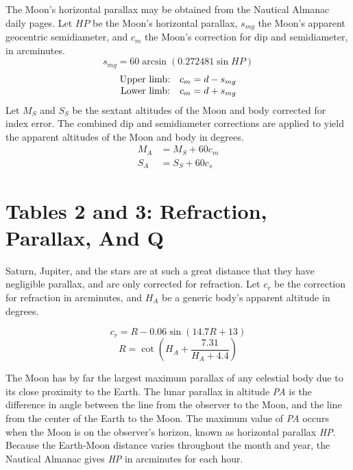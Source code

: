 \documentclass[letterpaper]{article}
\numberwithin{equation}{section}
\begin{document}
	The Moon's horizontal parallax may be obtained from the Nautical Almanac daily pages. Let $\mathit{HP}$ be the Moon's horizontal parallax, $s_{mg}$ the Moon's apparent geocentric semidiameter, and $c_m$ the Moon's correction for dip and semidiameter, in arcminutes.
	 \begin{equation}
	s_{mg} = 60 \arcsin (0.272481 \sin \mathit{HP})
	\end{equation}  
	\begin{equation}
	\begin{array}{@{}rl@{}}
	\text{Upper limb:} & c_m = d - s_{mg} \\
	\text{Lower limb:} & c_m = d + s_{mg}
	\end{array}
	\end{equation}
	Let $M_S$ and $S_S$ be the sextant altitudes of the Moon and body corrected for index error. The combined dip and semidiameter corrections are applied to yield the apparent altitudes of the Moon and body in degrees.
	\begin{align}
		M_{\!A} &= M_{\!S} + 60 c_m \\
		S_{\!A} &= S_{\!S} + 60 c_s
	\end{align}
	
\clearpage \section{Tables 2 and 3: Refraction, Parallax, And Q}
	Saturn, Jupiter, and the stars are at such a great distance that they have negligible parallax, and are only corrected for refraction. Let $c_r$ be the correction for refraction in arcminutes, and $H_{\!A}$ be a generic body's apparent altitude in degrees.

	 \begin{equation}
	c_r = R - 0.06 \sin(14.7 R + 13)
	\end{equation}  
	\begin{equation}
	R = \cot\left(H_{\!A} + \frac{7.31}{H_{\!A} + 4.4}\right)
	\end{equation}

	The Moon has by far the largest maximum parallax of any celestial body due to its close proximity to the Earth. The lunar parallax in altitude \textit{PA} is the difference in angle between the line from the observer to the Moon, and the line from the center of the Earth to the Moon. The maximum value of \textit{PA} occurs when the Moon is on the observer's horizon, known as horizontal parallax \textit{HP}. Because the Earth-Moon distance varies throughout the month and year, the Nautical Almanac gives \textit{HP} in arcminutes for each hour.
	
\end{document}
